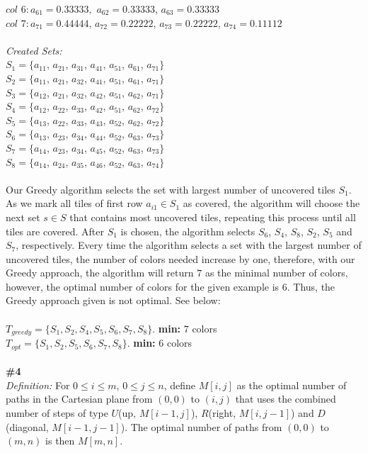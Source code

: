 \documentclass{article}
\begin{document}
$col$ $6 : a_{61} = 0.33333,$ $a_{62} = 0.33333$, $a_{63} = 0.33333$\\
$col$ $7 : a_{71} = 0.44444$, $a_{72} = 0.22222$, $a_{73} = 0.22222$, $a_{74} = 0.11112$\\
\\\textit{Created Sets:}\\
$S_1 = \{a_{11}$, $a_{21}$, $a_{31}$, $a_{41}$, $a_{51}$, $a_{61}$, $a_{71} \}$\\
$S_2 = \{a_{11}$, $a_{21}$, $a_{32}$, $a_{41}$, $a_{51}$, $a_{61}$, $a_{71} \}$\\
$S_3 = \{a_{12}$, $a_{21}$, $a_{32}$, $a_{42}$, $a_{51}$, $a_{62}$, $a_{71} \}$\\
$S_4 = \{a_{12}$, $a_{22}$, $a_{33}$, $a_{42}$, $a_{51}$, $a_{62}$, $a_{72} \}$\\
$S_5 = \{a_{13}$, $a_{22}$, $a_{33}$, $a_{43}$, $a_{52}$, $a_{62}$, $a_{72}\}$\\
$S_6 = \{a_{13}$, $a_{23}$, $a_{34}$, $a_{44}$, $a_{52}$, $a_{63}$, $a_{73}\}$\\
$S_7 = \{a_{14}$, $a_{23}$, $a_{34}$, $a_{45}$, $a_{52}$, $a_{63}$, $a_{73}\}$\\
$S_8 = \{a_{14}$, $a_{24}$, $a_{35}$, $a_{46}$, $a_{52}$, $a_{63}$, $a_{74}\}$\\
\\
Our Greedy algorithm selects the set with largest number of uncovered tiles $S_1$. As we mark all tiles of first row $a_{i1} \in S_1$ as covered, the algorithm will choose the next set $s \in S$ that contains most uncovered tiles, repeating this process until all tiles are covered. After $S_1$ is chosen, the algorithm selects $S_6$, $S_4$, $S_8$, $S_2$, $S_5$ and $S_7$, respectively. Every time the algorithm selects a set with the largest number of uncovered tiles, the number of colors needed increase by one, therefore, with our Greedy approach, the algorithm will return $7$ as the minimal number of colors, however, the optimal number of colors for the given example is $6$. Thus, the Greedy approach given is not optimal. See below:\\
\\
$T_{greedy} = \{S_1, S_2, S_4, S_5, S_6, S_7, S_8\}$. \textbf{min:} $7$ colors\\
$T_{opt} = \{S_1, S_2, S_5, S_6, S_7, S_8\}$. \textbf{min:} 6 colors\\
\\
\textbf{\#4}\\
\textit{Definition:} For $0 \leq i \leq m$, $0 \leq j \leq n$, define $M[i, j]$ as the optimal number of paths in the Cartesian plane from $(0, 0)$ to $(i, j)$ that uses the combined number of steps of type $U$(up, $M[i-1, j]$), $R$(right, $M[i, j-1]$) and $D$(diagonal, $M[i-1, j-1]$). The optimal number of paths from $(0,0)$ to $(m, n)$ is then $M[m, n]$.\\
\end{document}
